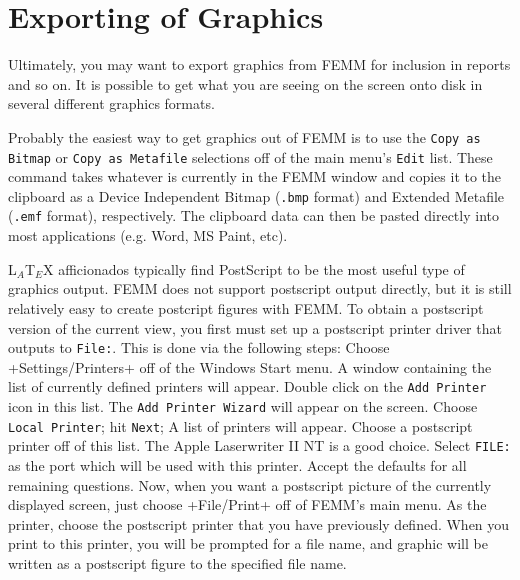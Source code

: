 \documentclass[12pt]{report}
\begin{document}






\section{Exporting of Graphics}

Ultimately, you may want to export graphics from FEMM for inclusion
in reports and so on. It is possible to get what you are seeing on
the screen onto disk in several different graphics formats.

Probably the easiest way to get graphics out of FEMM is to use the
\texttt{Copy as Bitmap} or \texttt{Copy as Metafile} selections off of the
main menu's \texttt{Edit} list. These command takes whatever is
currently in the FEMM window and copies it to the clipboard as a
Device Independent Bitmap (\texttt{.bmp} format) and Extended
Metafile (\texttt{.emf} format), respectively. The clipboard data
can then be pasted directly into most applications (e.g. Word, MS
Paint, etc).

L$_{A}$T$_{E}$X afficionados typically find PostScript to be the
most useful type of graphics output. FEMM does not support
postscript output directly, but it is still relatively easy to
create postcript figures with FEMM. To obtain a postscript version
of the current view, you first must set up a postscript printer
driver that outputs to \texttt{File:}. This is done via the
following steps: Choose +Settings/Printers+ off of the Windows
Start menu. A window containing the list of currently defined
printers will appear. Double click on the \texttt{Add Printer} icon
in this list. The
\texttt{Add Printer Wizard} will appear on the screen. Choose \texttt{Local
Printer}; hit \texttt{Next}; A list of printers will appear. Choose
a postscript printer off of this list. The Apple Laserwriter II NT
is a good choice. Select \texttt{FILE:} as the port which will be
used with this printer. Accept the defaults for all remaining
questions. Now, when you want a postscript picture of the currently
displayed screen, just choose +File/Print+ off of FEMM's main menu.
As the printer, choose the postscript printer that you have
previously defined. When you print to this printer, you will be
prompted for a file name, and graphic will be written as a
postscript figure to the specified file name.
\end{document}
